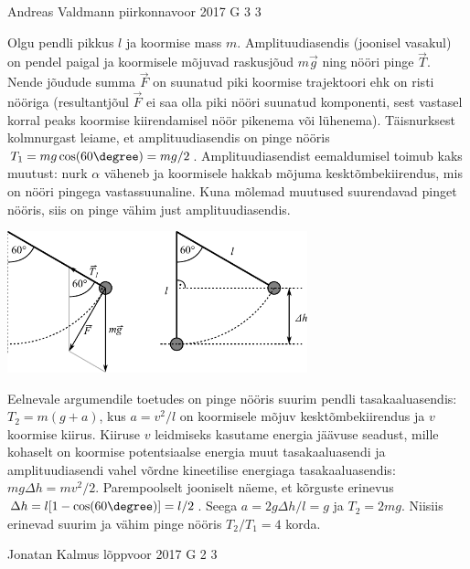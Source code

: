 \documentclass[11pt, twoside]{article}
\begin{document}
{%
{Andreas Valdmann} %
{piirkonnavoor} %
{2017} %
{G 3} %
{3} %
{

\ifSolution
Olgu pendli pikkus $l$ ja koormise mass $m$. Amplituudiasendis (joonisel vasakul) on pendel paigal ja koormisele mõjuvad raskusjõud $m\vec{g}$ ning nööri pinge $\vec{T}$. Nende jõudude summa $\vec{F}$ on suunatud piki koormise trajektoori ehk on risti nööriga (resultantjõul $\vec{F}$ ei saa olla piki nööri suunatud komponenti, sest vastasel korral peaks koormise kiirendamisel nöör pikenema või lühenema). Täisnurksest kolmnurgast leiame, et amplituudiasendis on pinge nööris $T_1 = mg\cos(60\degree) = mg / 2$. Amplituudiasendist eemaldumisel toimub kaks muutust: nurk $\alpha$ väheneb ja koormisele hakkab mõjuma kesktõmbekiirendus, mis on nööri pingega vastassuunaline. Kuna mõlemad muutused suurendavad pinget nööris, siis on pinge vähim just amplituudiasendis.

\begin{center}
	\vspace{-10pt}
	\includegraphics[width=0.65\textwidth]{2017-v2g-03-pendel-joonis.pdf}
	\vspace{-15pt}
\end{center}

Eelnevale argumendile toetudes on pinge nööris suurim pendli tasakaaluasendis: $T_2 = m(g + a)$, kus $a = v^2 / l$ on koormisele mõjuv kesktõmbekiirendus ja $v$ koormise kiirus. Kiiruse $v$ leidmiseks kasutame energia jäävuse seadust, mille kohaselt on koormise potentsiaalse energia muut tasakaaluasendi ja amplituudiasendi vahel võrdne kineetilise energiaga tasakaaluasendis: $mg\Delta h = mv^2 / 2$. Parempoolselt jooniselt näeme, et kõrguste erinevus $\Delta h = l[1-\cos(60\degree)] = l / 2$. Seega $a = 2g\Delta h / l = g$ ja $T_2 = 2mg$. Niisiis erinevad suurim ja vähim pinge nööris $T_2 / T_1 = 4$ korda.
\fi
}

{Jonatan Kalmus} %
{lõppvoor} %
{2017} %
{G 2} %
{3} %
{

}}
\end{document}
